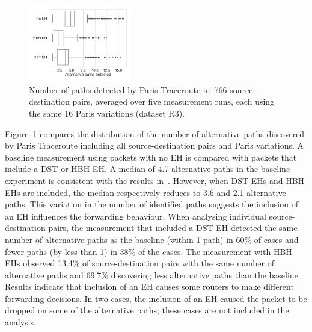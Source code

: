 \documentclass[conference]{IEEEtran}
\begin{document}


\begin{figure}[t]
\centering
  \includegraphics[width=0.4\textwidth]{altpaths.png}
  \caption{Number of paths detected by Paris Traceroute in~766
source-destination pairs, averaged over five measurement runs, each using
the same 16 Paris variations (dataset R3).}
  \label{fig:paths-detected}
\end{figure}



Figure~\ref{fig:paths-detected} compares the distribution of the number of
alternative paths discovered by Paris Traceroute including all
source-destination pairs and Paris variations.  A baseline measurement using packets with no EH
is compared with packets that include a DST or HBH EH.  
A median of 4.7 alternative paths in the baseline experiment is consistent with the
results in~\cite{augustin2006avoiding}.  However, when DST EHs and HBH EHs are
included, the median respectively reduces to 3.6 and 2.1 alternative paths.  
This variation in the number of identified paths suggests the inclusion of
an EH influences the forwarding behaviour. 
When analysing individual source-destination pairs, the
measurement that included a DST EH detected the same number of alternative paths as the baseline
(within 1 path) in 60\% of cases and fewer paths (by less than 1) in 38\% of
the cases.  The measurement with HBH EHs observed 13.4\%
of source-destination pairs with the same number of alternative paths and
69.7\% discovering less alternative paths than the baseline.
Results indicate that inclusion of an EH causes some routers to make
different forwarding decisions. In two cases, the inclusion of an EH caused the packet to be dropped on some of the alternative paths; these cases are not included in the analysis.
\end{document}
